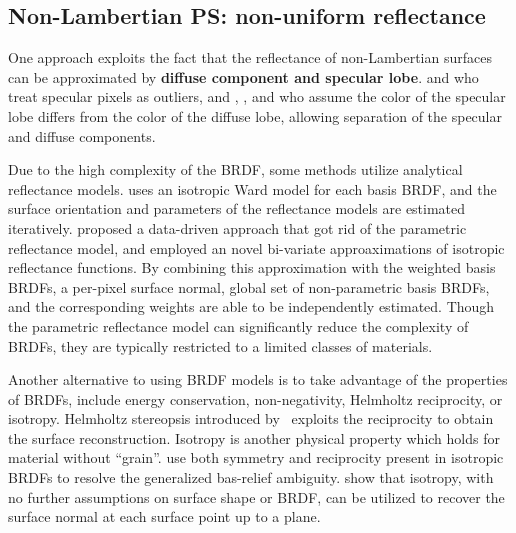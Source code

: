 \subsection{Non-Lambertian PS: non-uniform reflectance}
One approach exploits the fact that the reflectance of non-Lambertian surfaces can be approximated by \textbf{diffuse component and specular lobe}. \citeauthor{coleman1982obtaining} and \citeauthor{barsky20034} who treat specular pixels as outliers, and \citeauthor{schluns1993photometric}, \citeauthor{sato1994temporal}, and \citeauthor{mallick2005beyond} who assume the color of the specular lobe differs from the color of the diffuse lobe, allowing separation of the specular and diffuse components.

Due to the high complexity of the BRDF, some methods utilize {analytical reflectance models}. \citeauthor{goldman2010shape} uses an isotropic Ward model for each basis BRDF, and the surface orientation and parameters of the reflectance models are estimated iteratively. \citeauthor{alldrin2008photometric} proposed a data-driven approach that got rid of the parametric reflectance model, and employed an novel bi-variate approaximations of isotropic reflectance functions. By combining this approximation with the weighted basis BRDFs, a per-pixel surface normal, global set of non-parametric basis BRDFs, and the corresponding weights are able to be independently estimated. Though the parametric reflectance model can significantly reduce the complexity of BRDFs, they are typically restricted to a limited classes of materials.

Another alternative to using BRDF models is to take advantage of the properties of BRDFs, include energy conservation, non-negativity, Helmholtz reciprocity, or isotropy. Helmholtz stereopsis introduced by~\citeauthor{zickler2002helmholtz} exploits the reciprocity to obtain the surface reconstruction. Isotropy is another physical property which holds for material without ``grain''. \citeauthor{tan2007isotropy} use both symmetry and reciprocity present in isotropic BRDFs to resolve the generalized bas-relief ambiguity. \citeauthor{alldrin2007toward} show that isotropy, with no further assumptions on surface shape or BRDF, can be utilized to recover the surface normal at each surface point up to a plane.

